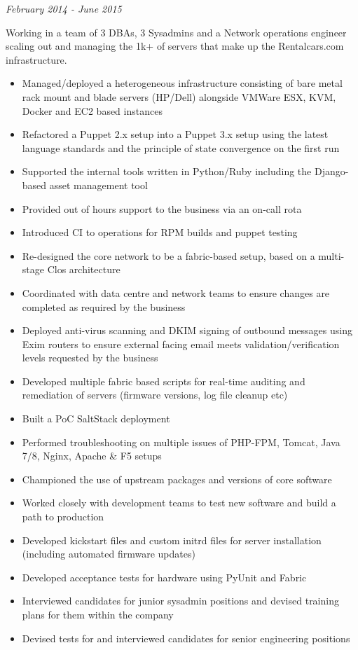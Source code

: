 \emph{February 2014 - June 2015}

Working in a team of 3 DBAs, 3 Sysadmins and a Network operations
engineer scaling out and managing the 1k+ of servers that make up the
Rentalcars.com infrastructure.

\begin{itemize}
\tightlist
\item
  Managed/deployed a heterogeneous infrastructure consisting of bare
  metal rack mount and blade servers (HP/Dell) alongside VMWare ESX,
  KVM, Docker and EC2 based instances
\item
  Refactored a Puppet 2.x setup into a Puppet 3.x setup using the latest
  language standards and the principle of state convergence on the first
  run
\item
  Supported the internal tools written in Python/Ruby including the
  Django-based asset management tool
\item
  Provided out of hours support to the business via an on-call rota
\item
  Introduced CI to operations for RPM builds and puppet testing
\item
  Re-designed the core network to be a fabric-based setup, based on a
  multi-stage Clos architecture
\item
  Coordinated with data centre and network teams to ensure changes are
  completed as required by the business
\item
  Deployed anti-virus scanning and DKIM signing of outbound messages
  using Exim routers to ensure external facing email meets
  validation/verification levels requested by the business
\item
  Developed multiple fabric based scripts for real-time auditing and
  remediation of servers (firmware versions, log file cleanup etc)
\item
  Built a PoC SaltStack deployment
\item
  Performed troubleshooting on multiple issues of PHP-FPM, Tomcat, Java
  7/8, Nginx, Apache \& F5 setups
\item
  Championed the use of upstream packages and versions of core software
\item
  Worked closely with development teams to test new software and build a
  path to production
\item
  Developed kickstart files and custom initrd files for server
  installation (including automated firmware updates)
\item
  Developed acceptance tests for hardware using PyUnit and Fabric
\item
  Interviewed candidates for junior sysadmin positions and devised
  training plans for them within the company
\item
  Devised tests for and interviewed candidates for senior engineering
  positions
\end{itemize}

